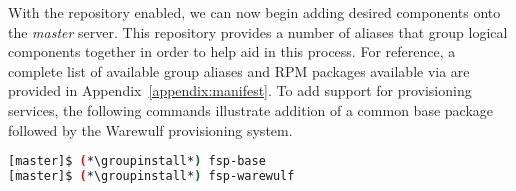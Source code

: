 With the \OHPC{} repository enabled, we can now begin adding desired components onto the
{\em master} server. This repository provides a number of aliases that group
logical components together in order to help aid in this process. For
reference, a complete list of available group aliases and RPM packages available
via \OHPC{} are provided in Appendix~\ref{appendix:manifest}.  To add
support for provisioning services, the following commands illustrate addition
of a common base package followed by the Warewulf provisioning system.

\begin{lstlisting}[language=bash,keywords={}]
[master]$ (*\groupinstall*) fsp-base
[master]$ (*\groupinstall*) fsp-warewulf
\end{lstlisting}

